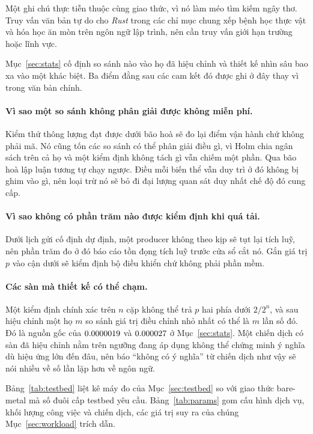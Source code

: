 Một ghi chú thực tiễn thuộc cùng giao thức, vì nó làm méo tìm kiếm ngây thơ. Truy vấn văn bản tự do
cho \emph{Rust} trong các chỉ mục chung xếp bệnh học thực vật và hóa học ăn mòn trên ngôn ngữ lập
trình, nên cần truy vấn giới hạn trường hoặc lĩnh vực.

Mục~\ref{sec:stats} cố định so sánh nào vào họ đã hiệu chỉnh và thiết kế nhìn sâu bao xa vào một
khác biệt. Ba điểm đằng sau các cam kết đó được ghi ở đây thay vì trong văn bản chính.

\paragraph{Vì sao một so sánh không phân giải được không miễn phí.}
Kiểm thử thông lượng đạt được dưới bão hoà sẽ đo lại điểm vận hành chứ không phải mã. Nó cũng tốn
các so sánh có thể phân giải điều gì, vì Holm chia ngân sách trên cả họ và một kiểm định không tách
gì vẫn chiếm một phần. Qua bão hoà lập luận tương tự chạy ngược. Điều mỗi biến thể vẫn duy trì ở đó
không bị ghim vào gì, nên loại trừ nó sẽ bỏ đi đại lượng quan sát duy nhất chế độ đó cung cấp.

\paragraph{Vì sao không có phần trăm nào được kiểm định khi quá tải.}
Dưới lịch gửi cố định dự định, một producer không theo kịp sẽ tụt lại tích luỹ, nên phần trăm đo ở
đó báo cáo tồn đọng tích luỹ trước cửa sổ cắt nó. Gắn giá trị $p$ vào cận dưới sẽ kiểm định bộ
điều khiển chứ không phải phần mềm.

\paragraph{Các sàn mà thiết kế có thể chạm.}
Một kiểm định chính xác trên $n$ cặp không thể trả $p$ hai phía dưới $2/2^{n}$, và sau hiệu chỉnh một
họ $m$ so sánh giá trị điều chỉnh nhỏ nhất có thể là $m$ lần số đó. Đó là nguồn gốc của
$0.0000019$ và $0.000027$ ở Mục~\ref{sec:stats}. Một chiến dịch có sàn đã hiệu chỉnh
nằm trên ngưỡng đang áp dụng không thể chứng minh ý nghĩa dù hiệu ứng lớn đến đâu, nên báo ``không
có ý nghĩa'' từ chiến dịch như vậy sẽ nói nhiều về số lần lặp hơn về ngôn ngữ.

Bảng~\ref{tab:testbed} liệt kê máy đo của Mục~\ref{sec:testbed} so với giao thức bare-metal mà số
đuôi cấp testbed yêu cầu. Bảng~\ref{tab:params} gom cấu hình dịch vụ, khối lượng công việc và
chiến dịch, các giá trị suy ra của chúng Mục~\ref{sec:workload} trích dẫn.

